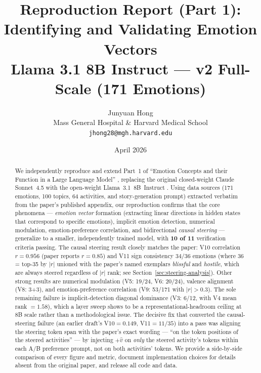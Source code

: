 \documentclass[11pt,a4paper]{article}
\title{Reproduction Report (Part 1): Identifying and Validating Emotion Vectors\\
       \large Llama 3.1 8B Instruct --- v2 Full-Scale (171 Emotions)}
\author{Junyuan Hong\\
  Mass General Hospital \& Harvard Medical School\\
  \texttt{jhong28@mgh.harvard.edu}}
\date{April 2026}
\begin{document}
\maketitle

\begin{abstract}
We independently reproduce and extend Part~1 of ``Emotion Concepts and
their Function in a Large Language Model''
\citep{anthropic2025emotion}, replacing the original closed-weight
Claude Sonnet~4.5 with the open-weight Llama~3.1~8B~Instruct
\citep{llama31}.  Using data sources
(171 emotions, 100 topics, 64 activities, and story-generation prompt)
extracted verbatim from the paper's published appendix, our
reproduction confirms that the core phenomena ---
\emph{emotion vector} formation (extracting linear directions in hidden
states that correspond to specific emotions), implicit emotion
detection, numerical modulation, emotion-preference correlation, and
bidirectional \emph{causal steering} ---
generalize to a smaller, independently trained model, with
\textbf{10 of 11} verification criteria passing.  The causal steering
result closely matches the paper: V10 correlation
$r{=}0.956$ (paper reports $r{=}0.85$) and V11 sign consistency
$34/36$ emotions (where 36 = top-35 by $|r|$ unioned with the paper's
named exemplars \emph{blissful} and \emph{hostile}, which are always
steered regardless of $|r|$ rank; see Section~\ref{sec:steering-analysis}).
Other strong results are numerical modulation
(V5: 19/24, V6: 20/24), valence alignment (V8: 3+3), and
emotion-preference correlation (V9: 53/171 with $|r|>0.3$).  The sole
remaining failure is implicit-detection diagonal dominance
(V3: 6/12, with V4 mean rank $=1.58$), which a layer sweep shows to be
a representational-headroom ceiling at 8B scale rather than a
methodological issue.  The decisive fix that converted the causal-
steering failure (an earlier draft's V10$=0.149$, V11$=11/35$) into a
pass was aligning the steering token span with the paper's exact
wording --- ``on the token positions of the steered activities'' ---
by injecting $+\hat{v}$ on \emph{only} the steered activity's tokens
within each A/B preference prompt, not on both activities'
tokens.  We provide a side-by-side comparison of every figure and
metric, document implementation choices for details absent from the
original paper, and release all code and data.
\end{abstract}

\end{document}
